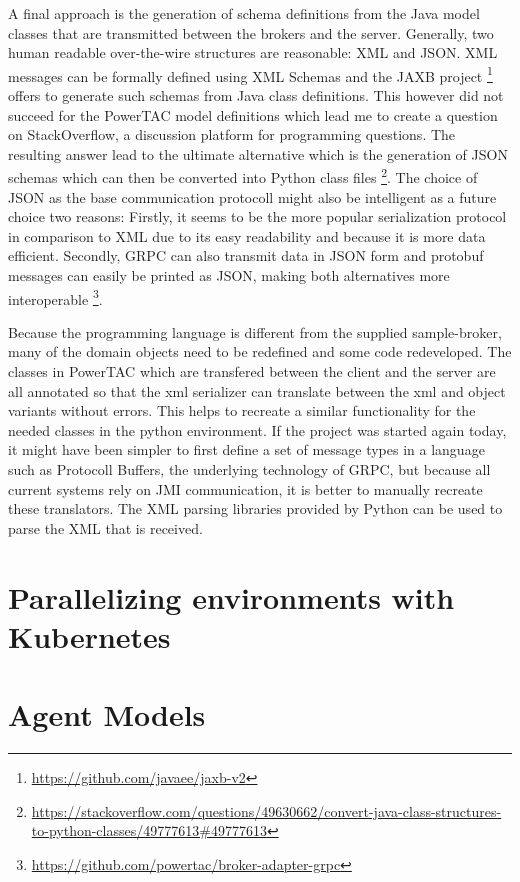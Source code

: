 A final approach is the generation of schema definitions from the Java model classes that are transmitted between the brokers and the server. Generally, two human readable over-the-wire structures are reasonable: \ac {XML} and \ac{JSON}. \ac {XML} messages can be formally defined using \ac {XML} Schemas and the \ac{JAXB} project
\footnote{\url{https://github.com/javaee/jaxb-v2}}
offers to generate such schemas from Java class definitions. This however did not succeed for the \ac {PowerTAC} model definitions which lead me to create a question on StackOverflow, a discussion platform for programming questions. The resulting answer lead to the ultimate alternative which is the generation of \ac {JSON} schemas which can then be converted into Python class files  
\footnote{\url{https://stackoverflow.com/questions/49630662/convert-java-class-structures-to-python-classes/49777613\#49777613}}.
The choice of \ac {JSON} as the base communication protocoll might also be intelligent as a future choice two reasons: Firstly, it seems to be the more popular serialization protocol in comparison to \ac {XML} \citep{jsonxml} due to its easy readability and because it is more data efficient. Secondly, \ac {GRPC} can also transmit data in \ac {JSON} form and protobuf messages can easily be printed as \ac {JSON}, making both alternatives more interoperable
\footnote{\url{https://github.com/powertac/broker-adapter-grpc} }.

Because the programming language is different from the supplied sample-broker, many of the domain objects need to be redefined and some code redeveloped. The classes in \ac {PowerTAC} which are transfered between the client and the server are all annotated so that the xml serializer can translate between the xml and object variants without errors. This helps to recreate a similar functionality for the needed classes in the python environment. If the project was started again today, it might have been simpler to first define a set of message types in a language such as Protocoll Buffers, the underlying technology of \ac {GRPC}, but because all current systems rely on \ac {JMI} communication, it is better to manually recreate these translators. The \ac {XML} parsing libraries provided by Python can be used to parse the \ac {XML} that is received.
\section{Parallelizing environments with Kubernetes}

\section{Agent Models}

